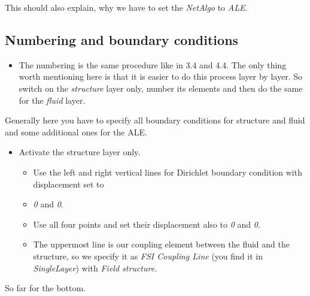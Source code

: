 \begin{itemize}

This should also explain, why we have to set the \emph{NetAlgo} to
\emph{ALE}.


\subsection{Numbering and boundary conditions}

\begin{itemize}
\item The numbering is the same procedure like in 3.4 and 4.4. The only
thing worth mentioning here is that it is easier to do this process
layer by layer. So switch on the \emph{structure} layer only, number
its elements and then do the same for the \emph{fluid} layer.
\end{itemize}
Generally here you have to specify all boundary conditions for structure and fluid
and some additional ones for the ALE.

\begin{itemize}
\item Activate the structure layer only. 

\begin{itemize}
\item Use the left and right vertical lines for Dirichlet boundary condition with displacement
set to 
\item \emph{0} and \emph{0}. 
\item Use all four points and set their displacement also to \emph{0} and
\emph{0}.
\item The uppermost line is our coupling element between the fluid and the
structure, so we specify it as \emph{FSI Coupling Line} (you find
it in \emph{SingleLayer}) with \emph{Field structure}.
\end{itemize}
\end{itemize}
So far for the bottom.


\end{itemize}
